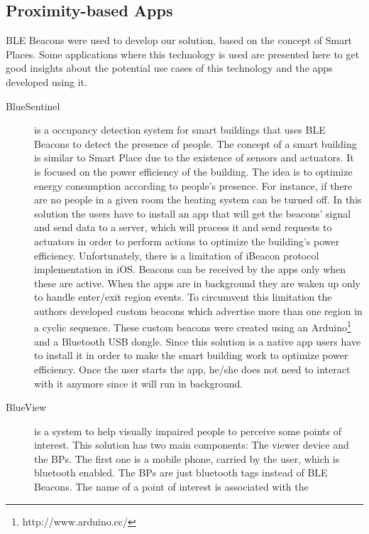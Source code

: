 \subsection{Proximity-based Apps}
\label{sub:background_ble_beacons_applications}
\gls{BLE} Beacons were
used to develop our solution, based on the concept of Smart Places.
Some applications where this technology is used
are presented here to
get good insights about the potential use cases of this
technology and the apps developed using it.
\begin{description}
  \item[BlueSentinel\cite{Conte2014}]
  is a
  occupancy detection system for smart buildings
  that uses \gls{BLE} Beacons to detect the presence of
  people. The concept of a smart building
  is similar to Smart Place
  due to the existence of sensors and actuators.
  It is focused on the power efficiency of the
  building.
  The idea is to optimize energy
  consumption according to people's presence.
  For instance, if there are no people in a given room
  the heating system can be turned off.
  In this solution the users have to install
  an app that will get the beacons' signal and
  send data to a server, which will process it
  and send requests to actuators in order to
  perform actions to optimize the
  building's power efficiency.
  Unfortunately, there is a limitation
  of iBeacon protocol implementation
  in iOS.
  Beacons can be received by the apps
  only when these are active. When the apps are in
  background they are waken up only to handle
  enter/exit region events. To circumvent this
  limitation the authors developed custom
  beacons which advertise more than one region
  in a cyclic sequence. These custom beacons
  were created using an
  Arduino\footnote{http://www.arduino.cc/}
  and a Bluetooth \gls{USB} dongle.
  Since this solution is a native app
  users have to install it in order
  to make the smart building work to
  optimize power efficiency.
  Once the user starts the app, he/she does not
  need to interact with it anymore since it
  will run in background.
  \item[BlueView\cite{Chen2013}]
  is a system to help
  visually impaired people to perceive some points of interest.
  This solution has two main components: The viewer device
  and the \glspl{BP}. The first one is a mobile phone,
  carried by the user, which is bluetooth enabled.
  The \glspl{BP} are just bluetooth tags instead of
  \gls{BLE} Beacons. The name of a point of interest is associated with the

\end{description}
